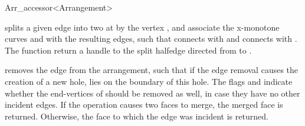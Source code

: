 \begin{ccRefClass}{Arr_accessor<Arrangement>}
\begin{ccAdvanced}
    {splits a given edge into two at by the vertex , and associate the
     x-monotone curves  and  with the resulting edges, such that
      connects  with  and  connects 
      with . The function return a handle to the split 
     halfedge directed from  to .
     }

  {removes the edge  from the arrangement, such that if the edge removal causes
   the creation of a new hole,  lies on the boundary of this hole.
   The flags  and  indicate whether the end-vertices
   of  should be removed as well, in case they have no other incident edges.
   If the operation causes two faces to merge, the merged face is returned.
   Otherwise, the face to which the edge was incident is returned.}

\end{ccAdvanced}

\end{ccRefClass}

\ccRefPageEnd
